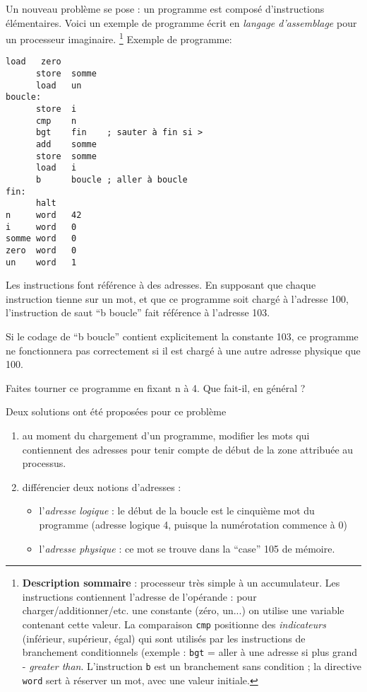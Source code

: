\begin{multicols}{2}
Un nouveau problème se pose : un programme est composé d'instructions
élémentaires. Voici un exemple de programme écrit en \emph{langage
  d'assemblage} pour un processeur imaginaire.
\footnote{
\textbf{Description
  sommaire} : processeur très simple à un accumulateur. Les
  instructions contiennent l'adresse de l'opérande : pour
  charger/additionner/etc. une constante (zéro, un...) on utilise une
  variable contenant cette valeur. La comparaison \texttt{cmp}
  positionne des \emph{indicateurs} (inférieur, supérieur, égal) qui
sont utilisés par les instructions de branchement conditionnels 
(exemple : \texttt{bgt} = aller
à une adresse si plus grand - \emph{greater than}. L'instruction 
\texttt{b} est un branchement sans condition ; 
la directive \texttt{word} sert à réserver
un mot, avec une valeur initiale.
}
Exemple de programme:
\begin{lstlisting}[frame=single]
      load   zero
      store  somme
      load   un
boucle:
      store  i
      cmp    n    
      bgt    fin    ; sauter à fin si >  
      add    somme 
      store  somme
      load   i
      b      boucle ; aller à boucle
fin:
      halt
n     word   42
i     word   0
somme word   0
zero  word   0
un    word   1
\end{lstlisting}
Les instructions font référence à des adresses. En supposant que
chaque instruction tienne sur un mot, et que ce programme soit chargé
à l'adresse 100, l'instruction de saut ``b boucle'' fait référence à
l'adresse 103.

Si le codage de ``b boucle'' contient explicitement la constante 103, ce
programme ne fonctionnera pas correctement si il est chargé à une
autre adresse physique que 100.

\begin{exercice}
Faites tourner ce programme en fixant n à 4. Que fait-il, en général ?
\end{exercice}

Deux solutions ont été proposées pour ce problème 
\begin{enumerate}
\item au moment du chargement d'un programme, modifier les mots 
qui contiennent
des adresses pour tenir compte de début de la zone attribuée 
au processus.
\item différencier deux notions d'adresses : 
\begin{itemize}
\item l'\emph{adresse logique} : le début de la boucle est le
  cinquième mot du programme (adresse logique 4, puisque la
  numérotation commence à 0)
\item l'\emph{adresse physique} : ce mot se trouve dans la ``case''
  105 de mémoire.
\end{itemize}
\end{enumerate}


\end{multicols}
